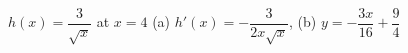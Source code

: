 {$h(x)=\dfrac3{\sqrt{x}}$ at $x=4$}
{(a) $h'(x)=-\dfrac3{2x\sqrt{x}}$, (b) $y%
=-\dfrac{3x}{16}+\dfrac94$}
